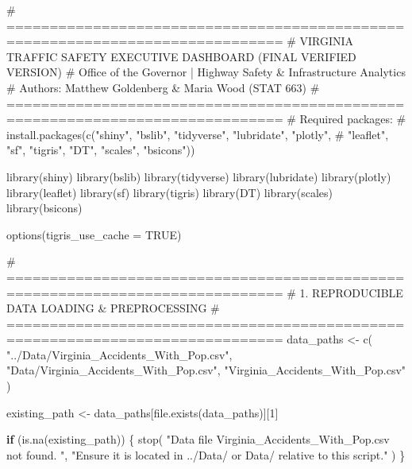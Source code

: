 \documentclass[
  letterpaper,
  DIV=11,
  numbers=noendperiod]{scrartcl}
\newenvironment{Shaded}{\begin{snugshade}}{\end{snugshade}}
\newcommand{\AttributeTok}[1]{\textcolor[rgb]{0.40,0.45,0.13}{#1}}
\newcommand{\CommentTok}[1]{\textcolor[rgb]{0.37,0.37,0.37}{#1}}
\newcommand{\ConstantTok}[1]{\textcolor[rgb]{0.56,0.35,0.01}{#1}}
\newcommand{\ControlFlowTok}[1]{\textcolor[rgb]{0.00,0.23,0.31}{\textbf{#1}}}
\newcommand{\DecValTok}[1]{\textcolor[rgb]{0.68,0.00,0.00}{#1}}
\newcommand{\FunctionTok}[1]{\textcolor[rgb]{0.28,0.35,0.67}{#1}}
\newcommand{\NormalTok}[1]{\textcolor[rgb]{0.00,0.23,0.31}{#1}}
\newcommand{\OtherTok}[1]{\textcolor[rgb]{0.00,0.23,0.31}{#1}}
\newcommand{\StringTok}[1]{\textcolor[rgb]{0.13,0.47,0.30}{#1}}
\begin{document}
\begin{Shaded}
\begin{Highlighting}[]
\CommentTok{\# ==============================================================================}
\CommentTok{\# VIRGINIA TRAFFIC SAFETY EXECUTIVE DASHBOARD (FINAL VERIFIED VERSION)}
\CommentTok{\# Office of the Governor | Highway Safety \& Infrastructure Analytics}
\CommentTok{\# Authors: Matthew Goldenberg \& Maria Wood (STAT 663)}
\CommentTok{\# ==============================================================================}
\CommentTok{\# Required packages:}
\CommentTok{\# install.packages(c("shiny", "bslib", "tidyverse", "lubridate", "plotly",}
\CommentTok{\#                    "leaflet", "sf", "tigris", "DT", "scales", "bsicons"))}

\FunctionTok{library}\NormalTok{(shiny)}
\FunctionTok{library}\NormalTok{(bslib)}
\FunctionTok{library}\NormalTok{(tidyverse)}
\FunctionTok{library}\NormalTok{(lubridate)}
\FunctionTok{library}\NormalTok{(plotly)}
\FunctionTok{library}\NormalTok{(leaflet)}
\FunctionTok{library}\NormalTok{(sf)}
\FunctionTok{library}\NormalTok{(tigris)}
\FunctionTok{library}\NormalTok{(DT)}
\FunctionTok{library}\NormalTok{(scales)}
\FunctionTok{library}\NormalTok{(bsicons)}

\FunctionTok{options}\NormalTok{(}\AttributeTok{tigris\_use\_cache =} \ConstantTok{TRUE}\NormalTok{)}

\CommentTok{\# ==============================================================================}
\CommentTok{\# 1. REPRODUCIBLE DATA LOADING \& PREPROCESSING}
\CommentTok{\# ==============================================================================}
\NormalTok{data\_paths }\OtherTok{\textless{}{-}} \FunctionTok{c}\NormalTok{(}
  \StringTok{"../Data/Virginia\_Accidents\_With\_Pop.csv"}\NormalTok{,}
  \StringTok{"Data/Virginia\_Accidents\_With\_Pop.csv"}\NormalTok{,}
  \StringTok{"Virginia\_Accidents\_With\_Pop.csv"}
\NormalTok{)}

\NormalTok{existing\_path }\OtherTok{\textless{}{-}}\NormalTok{ data\_paths[}\FunctionTok{file.exists}\NormalTok{(data\_paths)][}\DecValTok{1}\NormalTok{]}

\ControlFlowTok{if}\NormalTok{ (}\FunctionTok{is.na}\NormalTok{(existing\_path)) \{}
  \FunctionTok{stop}\NormalTok{(}
    \StringTok{"Data file \textquotesingle{}Virginia\_Accidents\_With\_Pop.csv\textquotesingle{} not found. "}\NormalTok{,}
    \StringTok{"Ensure it is located in \textquotesingle{}../Data/\textquotesingle{} or \textquotesingle{}Data/\textquotesingle{} relative to this script."}
\NormalTok{  )}
\NormalTok{\}}


\end{Highlighting}
\end{Shaded}
\end{document}
